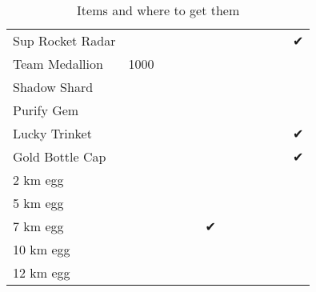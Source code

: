 \begin{table}
\begin{tabular}{p{}ccccccccccc}
Sup Rocket Radar  &      &   &           &    &    &     &     &     &   &   & ✔ \\
Team Medallion    & 1000 &   &           &    &    &     &     &     &   &   &   \\
Shadow Shard      &      &   &           &    &    &     &     &     &   &   &   \\
Purify Gem        &      &   &           &    &    &     &     &     &   &   &   \\
Lucky Trinket     &      &   &           &    &    &     &     &     &   &   & ✔ \\
Gold Bottle Cap   &      &   &           &    &    &     &     &     &   &   & ✔ \\
2 km egg          &      &   &           &    &    &     &     &     &   &   &   \\
5 km egg          &      &   &           &    &    &     &     &     &   &   &   \\
7 km egg          &      &   &           &    &  ✔ &     &     &     &   &   &   \\
10 km egg         &      &   &           &    &    &     &     &     &   &   &   \\
12 km egg         &      &   &           &    &    &     &     &     &   &   &   \\
\end{tabular}
\caption{Items and where to get them}
\end{table}
